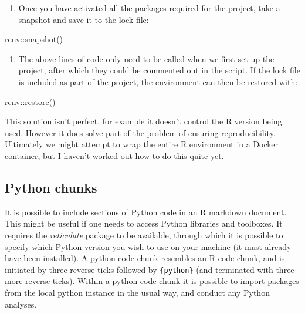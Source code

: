 \documentclass[
]{article}
\newenvironment{Shaded}{\begin{snugshade}}{\end{snugshade}}
\newcommand{\FunctionTok}[1]{\textcolor[rgb]{0.00,0.00,0.00}{#1}}
\newcommand{\NormalTok}[1]{#1}
\newcommand{\SpecialCharTok}[1]{\textcolor[rgb]{0.00,0.00,0.00}{#1}}
\providecommand{\tightlist}{%
  \setlength{\itemsep}{0pt}\setlength{\parskip}{0pt}}
\begin{document}
\begin{enumerate}
\def\labelenumi{\arabic{enumi}.}
\setcounter{enumi}{1}
\tightlist
\item
  Once you have activated all the packages required for the project, take a snapshot and save it to the lock file:
\end{enumerate}

\begin{Shaded}
\begin{Highlighting}[]
\NormalTok{renv}\SpecialCharTok{::}\FunctionTok{snapshot}\NormalTok{()}
\end{Highlighting}
\end{Shaded}

\begin{enumerate}
\def\labelenumi{\arabic{enumi}.}
\setcounter{enumi}{2}
\tightlist
\item
  The above lines of code only need to be called when we first set up the project, after which they could be commented out in the script. If the lock file is included as part of the project, the environment can then be restored with:
\end{enumerate}

\begin{Shaded}
\begin{Highlighting}[]
\NormalTok{renv}\SpecialCharTok{::}\FunctionTok{restore}\NormalTok{()}
\end{Highlighting}
\end{Shaded}

This solution isn't perfect, for example it doesn't control the R version being used. However it does solve part of the problem of ensuring reproducibility. Ultimately we might attempt to wrap the entire R environment in a Docker container, but I haven't worked out how to do this quite yet.

\hypertarget{python-chunks}{%
\subsection{Python chunks}\label{python-chunks}}

It is possible to include sections of Python code in an R markdown document. This might be useful if one needs to access Python libraries and toolboxes. It requires the \href{}{\emph{reticulate}} package to be available, through which it is possible to specify which Python version you wish to use on your machine (it must already have been installed). A python code chunk resembles an R code chunk, and is initiated by three reverse ticks followed by \texttt{\{python\}} (and terminated with three more reverse ticks). Within a python code chunk it is possible to import packages from the local python instance in the usual way, and conduct any Python analyses.
\end{document}
